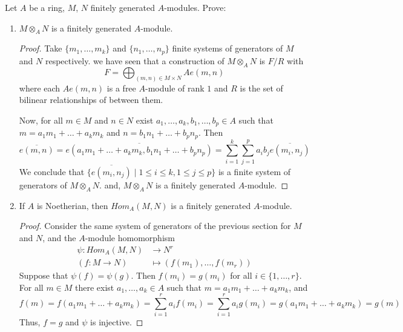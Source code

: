 \begin{problem}
    Let $A$ be a ring, $M$, $N$ finitely generated $A$-modules.
    Prove:
    \begin{enumerate}[label=(\theproblem.\arabic*),ref=\theproblem.\arabic*]
        \item $M \otimes_A N$ is a finitely generated $A$-module.
            \begin{sol}
                \begin{proof}
                    Take $\{m_1, \dots, m_k\}$ and $\{n_1, \dots, n_p\}$ finite systems of generators of $M$ and $N$ respectively.
                    we have seen that a construction of $M \otimes_A N$ is $F/R$ with
                    \[ F = \bigoplus_{(m,n) \in M \times N} A e(m,n)\]
                    where each $A e(m,n)$ is a free $A$-module of rank $1$ and $R$ is the set of bilinear relationships of between them.

                    Now, for all $m \in M$ and $n \in N$ exist $a_1, \dots, a_k, b_1, \dots, b_p \in A$ such that \linebreak
                    ${m = a_1 m_1 + \dots + a_k m_k}$
                    and ${n = b_1 n_1 + \dots + b_p n_p}$.
                    Then
                    \[
                       \overline{e(m,n)} = \overline{e(a_1 m_1 + \dots + a_k m_k, b_1 n_1 + \dots + b_p n_p)}
                       = \sum_{i=1}^{k}\sum_{j=1}^{p} a_i b_j \overline{e(m_i, n_j)}
                    \]
                    We conclude that $\{\overline{e(m_i, n_j)}\mid 1 \leq i \leq k, 1 \leq j \leq p\}$
                    is a finite system of generators of $M \otimes_A N$.
                    and, $M \otimes_A N$ is a finitely generated $A$-module.
                \end{proof}
            \end{sol}
        \item If $A$ is Noetherian, then $Hom_A(M,N)$ is a finitely generated $A$-module.
            \begin{sol}
                \begin{proof}
                    Consider the same system of generators of the previous section for $M$ and $N$, and the $A$-module homomorphism
                    \begin{align*}
                        \psi\colon Hom_A(M,N) &\to N^r \\
                        (f: M \rightarrow N) &\mapsto (f(m_1), \dots, f(m_r))
                    \end{align*}
                    Suppose that $\psi(f) = \psi(g)$.
                    Then $f(m_i) = g(m_i)$ for all $i \in \{1, \dots, r\}$.
                    For all $m \in M$ there exist $a_1, \dots, a_k \in A$ such that $m = a_1 m_1 + \dots + a_k m_k$, and
                    \[
                        f(m) = f(a_1 m_1 + \dots + a_k m_k) = \sum_{i=1}^{r} a_i f(m_i) = \sum_{i=1}^{r} a_i g(m_i) = g(a_1 m_1 + \dots + a_k m_k) = g(m)
                    \]
                    Thus, $f = g$ and $\psi$ is injective.


\end{proof}
\end{sol}
\end{enumerate}
\end{problem}
